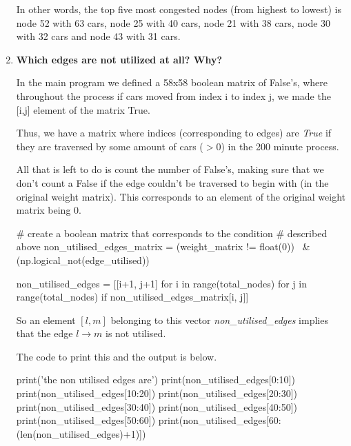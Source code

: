 \documentclass[paper=a4, fontsize=12pt]{scrartcl} %
\numberwithin{equation}{section}       %
\numberwithin{figure}{section}         %
\numberwithin{table}{section}          %
\begin{document}
\begin{enumerate}
In other words, the top five most congested nodes (from highest to lowest) is node 52 with 63 cars, node 25 with 40 cars, node 21 with 38 cars, node 30 with 32 cars and node 43 with 31 cars.
\newline


\item \textbf{Which edges are not utilized at all? Why?}
\leavevmode
\newline

In the main program we defined a 58x58 boolean matrix of False's, where throughout the process if cars moved from index i to index j, we made the [i,j] element of the matrix True.
\leavevmode
\newline

Thus, we have a matrix where indices (corresponding to edges) are \textit{True} if they are traversed by some amount of cars ($ > 0$) in the 200 minute process.
\leavevmode
\newline

All that is left to do is count the number of False's, making sure that we don't count a False if the edge couldn't be traversed to begin with (in the original weight matrix). This corresponds to an element of the original weight matrix being 0.

\begin{python}
# create a boolean matrix that corresponds to the condition
# described above
non_utilised_edges_matrix = (weight_matrix != float(0)) \
                                & (np.logical_not(edge_utilised))
                                
non_utilised_edges = [[i+1, j+1] for i in range(total_nodes)
                          for j in range(total_nodes)
                          if non_utilised_edges_matrix[i, j]]

\end{python}

So an element $[l,m]$ belonging to this vector \textit{non\_utilised\_edges} implies that the edge $l \to m$ is not utilised.

The code to print this and the output is below.

\begin{python}
print('the non utilised edges are')
print(non_utilised_edges[0:10])
print(non_utilised_edges[10:20])
print(non_utilised_edges[20:30])
print(non_utilised_edges[30:40])
print(non_utilised_edges[40:50])
print(non_utilised_edges[50:60])
print(non_utilised_edges[60:(len(non_utilised_edges)+1)])
\end{python}


\end{enumerate}
\end{document}
